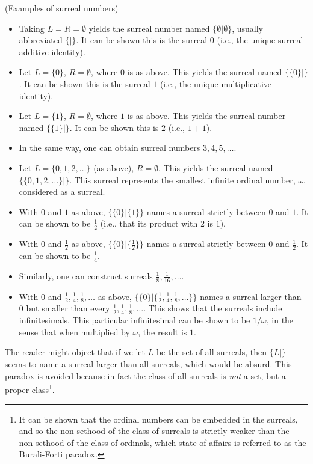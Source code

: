 \documentclass[twoside,11pt]{article}
\begin{document}
\begin{example}
    (Examples of surreal numbers)
    \begin{itemize}
        \item
        Taking $L=R=\emptyset$ yields the surreal number named $\{\emptyset|\emptyset\}$,
        usually abbreviated $\{|\}$. It can be shown this is the
        surreal $0$ (i.e., the unique surreal additive identity).
        \item
        Let $L=\{0\}$, $R=\emptyset$, where $0$ is as above.
        This yields the surreal named $\{\{0\}|\}$.
        It can be shown this is the surreal $1$ (i.e.,
        the unique multiplicative identity).
        \item
        Let $L=\{1\}$, $R=\emptyset$, where $1$ is as above. This yields the surreal
        number named $\{\{1\}|\}$. It can be shown this is $2$ (i.e., $1+1$).
        \item
        In the same way, one can obtain surreal numbers $3,4,5,\ldots$.
        \item
        Let $L=\{0,1,2,\ldots\}$ (as above), $R=\emptyset$. This yields the surreal
        named $\{\{0,1,2,\ldots\}|\}$. This surreal
        represents the smallest infinite ordinal number, $\omega$, considered as a surreal.
        \item
        With $0$ and $1$ as above, $\{\{0\}|\{1\}\}$ names a surreal strictly between $0$ and
        $1$. It can be shown to be $\frac12$
        (i.e., that its product with $2$ is $1$).
        \item
        With $0$ and $\frac12$ as above, $\{\{0\}|\{\frac12\}\}$ names a surreal strictly
        between $0$ and $\frac12$. It can be shown to be $\frac14$.
        \item
        Similarly, one can construct surreals $\frac18,\frac1{16},\ldots$.
        \item
        With $0$ and $\frac12,\frac14,\frac18,\ldots$ as above,
        $\{\{0\}|\{\frac12,\frac14,\frac18,\ldots\}\}$ names a surreal larger than $0$
        but smaller than every $\frac12,\frac14,\frac18,\ldots$. This shows that the
        surreals include infinitesimals. This particular infinitesimal can be shown
        to be $1/\omega$, in the sense that when multiplied by $\omega$, the result is $1$.
    \end{itemize}
\end{example}

The reader might object that if we let $L$ be the set of all surreals, then
$\{L|\}$ seems to name a surreal larger than all surreals,
which would be absurd. This paradox is avoided because in fact the class
of all surreals is \emph{not} a set, but a proper class\footnote{It can be shown
that the ordinal numbers can be embedded in the surreals, and so the non-sethood
of the class of surreals is strictly weaker than the non-sethood of the class of
ordinals, which state of affairs is referred to as the Burali-Forti paradox.}.
\end{document}
